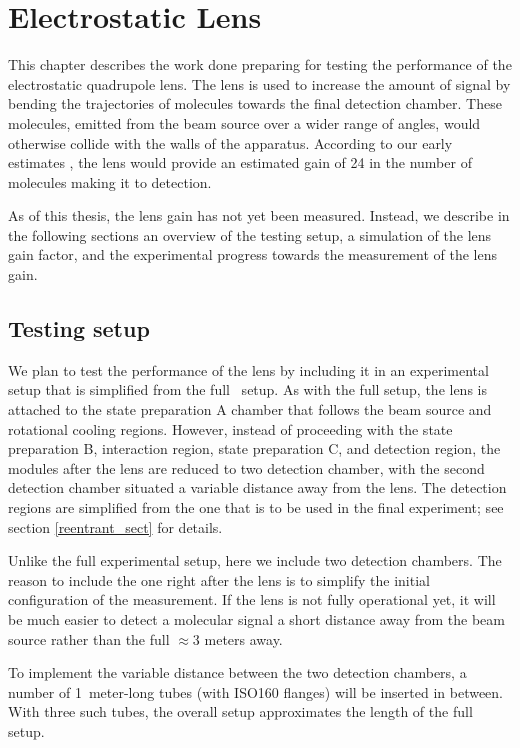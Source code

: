 \section{Electrostatic Lens}
\label{lens_ch}

This chapter describes the work done preparing for testing the performance of
the electrostatic quadrupole lens. The lens is used to increase the amount of
signal by bending the trajectories of molecules towards the final detection
chamber. These molecules, emitted from the beam source over a wider range of
angles, would otherwise collide with the walls of the apparatus. According to
our early estimates \cite{grasdijk2021centrex}, the lens would provide an
estimated gain of 24 in the number of molecules making it to detection.

As of this thesis, the lens gain has not yet been measured. Instead, we describe
in the following sections an overview of the testing setup, a simulation of the
lens gain factor, and the experimental progress towards the measurement of the
lens gain.

\subsection{Testing setup}
\label{testing_setup}

We plan to test the performance of the lens by including it in an experimental
setup that is simplified from the full \CENTREX\ setup. As with the full setup,
the lens is attached to the state preparation A chamber that follows the beam
source and rotational cooling regions. However, instead of proceeding with the
state preparation B, interaction region, state preparation C, and detection
region, the modules after the lens are reduced to two detection chamber, with
the second detection chamber situated a variable distance away from the lens.
The detection regions are simplified from the one that is to be used in the
final experiment; see section \ref{reentrant_sect} for details.

Unlike the full experimental setup, here we include two detection chambers. The
reason to include the one right after the lens is to simplify the initial
configuration of the measurement. If the lens is not fully operational yet, it
will be much easier to detect a molecular signal a short distance away from the
beam source rather than the full $\approx3$ meters away.

To implement the variable distance between the two detection chambers, a number
of 1~meter-long tubes (with ISO160 flanges) will be inserted in between. With
three such tubes, the overall setup approximates the length of the full setup.

